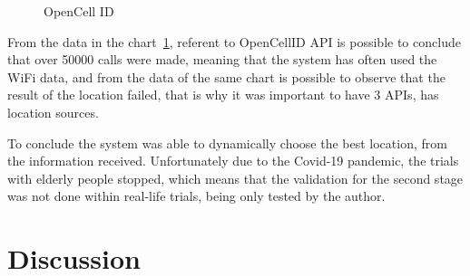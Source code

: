 \begin{figure}[htbp]
  \centering
  \caption{OpenCell ID}
  \label{fig:OpennCellID_chart}
\end{figure}




From the data  in the chart~\ref{fig:OpennCellID_chart}, referent to OpenCellID API is possible to conclude that over 50000 calls were made, meaning that the system has often used the WiFi data, and from the data of the same chart is possible to observe that the result of the location failed, that is why it was important to have 3 APIs, has location sources.

To conclude the system was able to dynamically choose the best location, from the information received. Unfortunately due to the Covid-19 pandemic, the trials with elderly people stopped, which means that the validation for the second stage was not done within real-life trials, being only tested by the author.


\section{Discussion}
\label{sec:Discussion}

